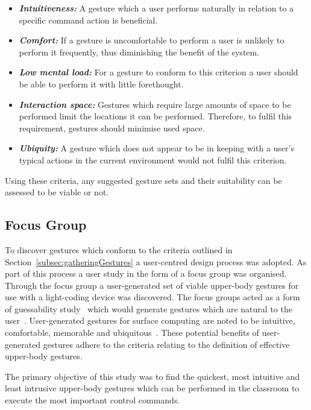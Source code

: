 \documentclass[link]{IWCOMP}
\begin{document}
\begin{itemize}
\item \textit{\textbf{Intuitiveness:}} A gesture which a user performs naturally in relation to a specific command action is beneficial.
\item \textit{\textbf{Comfort:}} If a gesture is uncomfortable to perform a user is unlikely to perform it frequently, thus diminishing the benefit of the system.
\item \textit{\textbf{Low mental load:}} For a gesture to conform to this criterion a user should be able to perform it with little forethought.
\item \textit{\textbf{Interaction space:}} Gestures which require large amounts of space to be performed limit the locations it can be performed.
Therefore, to fulfil this requirement, gestures should minimise used space.
\item \textit{\textbf{Ubiquity:}} A gesture which does not appear to be in keeping with a user's typical actions in the current environment would not fulfil this criterion. \\ 
\end{itemize}

Using these criteria, any suggested gesture sets and their suitability can be assessed to be viable or not.

\subsection{Focus Group} 
\label{subsec:focusGroupDesign}

To discover gestures which conform to the criteria outlined in Section~\ref{subsec:gatheringGestures} a user-centred design process was adopted.
As part of this process a user study in the form of a focus group was organised.
Through the focus group a user-generated set of viable upper-body gestures for use with a light-coding device was discovered.
The focus groups acted as a form of guessability study~\citep{Ruiz2011,Wobbrock2009} which would generate gestures which are natural to the user~\citep{Grandhi2011}.
User-generated gestures for surface computing are noted to be intuitive, comfortable, memorable and ubiquitous~\citep{Bjorneseth2012}.
These potential benefits of user-generated gestures adhere to the criteria relating to the definition of effective upper-body gestures.

The primary objective of this study was to find the quickest, most intuitive and least intrusive upper-body gestures which can be performed in the classroom to execute the most important control commands.
\end{document}
